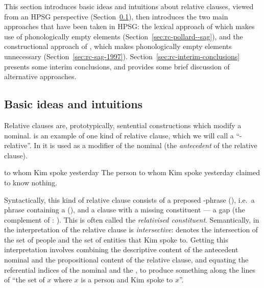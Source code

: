 \documentclass[output=paper,biblatex,babelshorthands,newtxmath,draftmode,colorlinks,citecolor=brown]{langscibook}
\begin{document}
This section introduces basic ideas and intuitions about relative clauses, viewed from an
HPSG perspective (Section~\ref{sec:rc-basic-}), then introduces the two main approaches that
have been taken in HPSG: the lexical approach of \citet{Pollard:Sag:94} which makes use of
phonologically empty elements (Section~\ref{sec:rc-pollard--sag}), and the constructional
approach of \citet{Sag:97}, which makes phonologically empty elements unnecessary (Section~\ref{sec:rc-sag-1997}).
Section~\ref{sec:rc-interim-conclusions} presents some interim conclusions, and 
provides some brief discussion of alternative approaches.

\subsection{Basic ideas and intuitions}
\label{sec:rc-basic-}

Relative clauses  are, prototypically, sentential constructions which modify a
nominal.   is an example of one kind of  relative clause, which we will call a
``-relative''. In  it is used  as a modifier of the nominal 
(the \emph{antecedent} of the relative clause).
\begin{exe}\label{x:rc-2}
  \ex\label{x:rc-3} to whom Kim spoke yesterday
  \ex\label{x:rc-4} The person to whom Kim spoke yesterday claimed to know nothing.
\end{exe}
Syntactically, this kind of relative clause consists of a preposed -phrase
(), i.e.\ a phrase containing a  (), and a
clause with a missing constituent --- a gap (the complement of : ). This is often called the \emph{relativised constituent}.
Semantically, in  the interpretation of the relative clause is
\emph{intersective}:  denotes the intersection of the set of people and the
set of entities that Kim spoke to. Getting this interpretation involves combining the
descriptive content of the antecedent nominal and the propositional content of the
relative clause, and equating the referential indices of the nominal and the , to produce something along the lines of ``the set of $x$ where $x$ is a person
and Kim spoke to $x$''.
\end{document}
